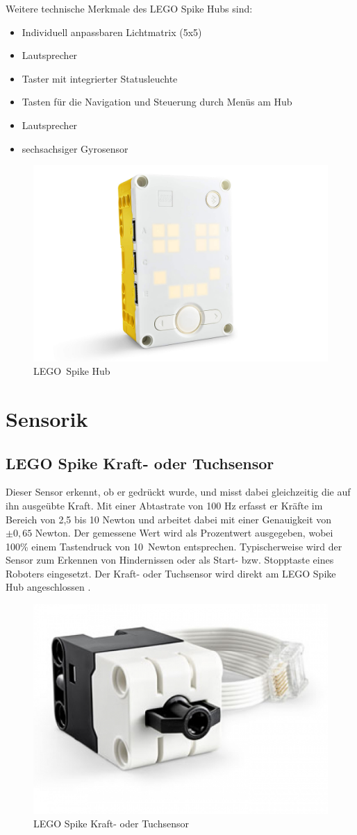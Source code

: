 Weitere technische Merkmale des LEGO Spike Hubs sind:
\begin{itemize}
	\item Individuell anpassbaren Lichtmatrix (5x5)
	\item Lautsprecher
	\item Taster mit integrierter Statusleuchte 
	\item Tasten für die Navigation und Steuerung durch Menüs am Hub 
	\item Lautsprecher
	\item sechsachsiger Gyrosensor 
\end{itemize} 

\begin{figure}[H]
	\centering
	\includegraphics[width=0.55\linewidth]{images/Hub}
	\caption[LEGO Spike Hub Quelle:\autocite{legoeducation2020spikesensors}]{LEGO Spike Hub}
	\label{fig:hub}
\end{figure}

\section{Sensorik}

\subsection{LEGO Spike Kraft- oder Tuchsensor}
Dieser Sensor erkennt, ob er gedrückt wurde, und misst dabei gleichzeitig die auf ihn ausgeübte Kraft. Mit einer Abtastrate von 100 Hz erfasst er Kräfte im Bereich von 2,5 bis 10 Newton und arbeitet dabei mit einer Genauigkeit von $\pm 0,65$ Newton. Der gemessene Wert wird als Prozentwert ausgegeben, wobei 100\% einem Tastendruck von 10 Newton entsprechen. Typischerweise wird der Sensor zum Erkennen von Hindernissen oder als Start- bzw. Stopptaste eines Roboters eingesetzt. Der Kraft- oder Tuchsensor wird direkt am LEGO Spike Hub angeschlossen \autocite{legoeducation2020spikesensors}.

\begin{figure}[H]
	\centering
	\includegraphics[width=0.4\linewidth]{images/Kraftsensor}
	\caption[LEGO Spike Kraft- oder Tuchsensor Quelle:\autocite{legoeducation2020spikesensors}]{LEGO Spike Kraft- oder Tuchsensor}
	\label{fig:kraftsensor}
\end{figure}

